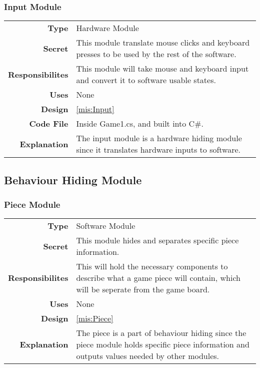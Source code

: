 \documentclass[10pt]{article}
\makeatletter
\newcommand{\CustomLabel}[1]{\Hy@raisedlink{\hypertarget{#1}{}}\label{#1}}
\makeatother
\begin{document}
    \subsubsection{Input Module}\CustomLabel{mod:Input}
    \begin{tabularx}{\linewidth}{ >{\bfseries}r X }
        Type            & Hardware Module \\
        Secret          & This module translate mouse clicks and keyboard presses to be used by the rest of the software. \\
        Responsibilites & This module will take mouse and keyboard input and convert it to software usable states. \\
        Uses            & None \\
        Design          & \ref{mis:Input} \\
        Code File       & Inside Game1.cs, and built into C\#. \\
        Explanation     & The input module is a hardware hiding module since it translates hardware inputs to software. \\
    \end{tabularx}

\subsection{Behaviour Hiding Module}

    \subsubsection{Piece Module}\CustomLabel{mod:Piece}
        \begin{tabularx}{\linewidth}{ >{\bfseries}r X }
            Type            & Software Module \\
            Secret          & This module hides and separates specific piece information. \\
            Responsibilites & This will hold the necessary components to describe what a game piece will contain, which will be seperate from the game board. \\
            Uses            & None \\
            Design          & \ref{mis:Piece} \\
            Explanation     & The piece is a part of behaviour hiding since the piece module holds specific piece information and outputs values needed by other modules. \\
        \end{tabularx}
\end{document}
